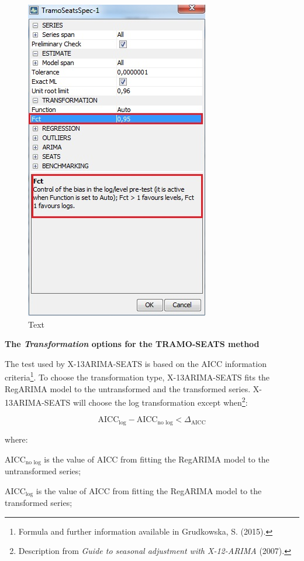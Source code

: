 \documentclass[
  letterpaper,
  DIV=11,
  numbers=noendperiod]{scrreprt}
\begin{document}
\begin{figure}

{\centering \includegraphics{./All_images/UG_SA_image37.jpg}

}

\caption{Text}

\end{figure}

\textbf{The \emph{Transformation} options for the TRAMO-SEATS method}

The test used by X-13ARIMA-SEATS is based on the AICC information
criteria\footnote{Formula and further information available in
  Grudkowska, S. (2015).}. To choose the transformation type,
X-13ARIMA-SEATS fits the RegARIMA model to the untransformed and the
transformed series. X-13ARIMA-SEATS will choose the log transformation
except when\footnote{Description from \emph{Guide to seasonal adjustment
  with X-12-ARIMA} (2007).}:

\[\text{AICC}_{\log} - \text{AICC}_{\text{no\ log}} < \Delta_{\text{AICC}}\]

where:

\(\text{AICC}_{\text{no\ log}}\) is the value of AICC from fitting the
RegARIMA model to the untransformed series;

\(\text{AICC}_{\log}\) is the value of AICC from fitting the RegARIMA
model to the transformed series;
\end{document}
